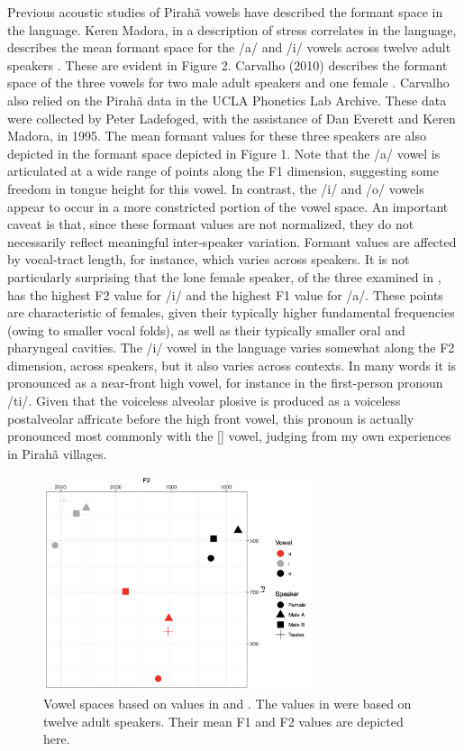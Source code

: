 \documentclass[output=paper,colorlinks,citecolor=brown
]{langscibook}
\begin{document}
    Previous acoustic studies of Pirahã vowels have described the formant space in the language. Keren Madora, in a description of stress correlates in the language, describes the mean formant space for the /a/ and /i/ vowels across twelve adult speakers \citep{everett1998acoustic}. These are evident in Figure 2. Carvalho (2010) describes the formant space of the three vowels for two male adult speakers and one female \citep{de2010vowel}. Carvalho also relied on the Pirahã data in the UCLA Phonetics Lab Archive. These data were collected by Peter Ladefoged, with the assistance of Dan Everett and Keren Madora, in 1995. The mean formant values for these three speakers are also depicted in the formant space depicted in Figure 1. Note that the /a/ vowel is articulated at a wide range of points along the F1 dimension, suggesting some freedom in tongue height for this vowel. In contrast, the /i/ and /o/ vowels appear to occur in a more constricted portion of the vowel space. An important caveat is that, since these formant values are not normalized, they do not necessarily reflect meaningful inter-speaker variation. Formant values are affected by vocal-tract length, for instance, which varies across speakers. It is not particularly surprising that the lone female speaker, of the three examined in , has the highest F2 value for /i/ and the highest F1 value for /a/. These points are characteristic of females, given their typically higher fundamental frequencies (owing to smaller vocal folds), as well as their typically smaller oral and pharyngeal cavities. The /i/ vowel in the language varies somewhat along the F2 dimension, across speakers, but it also varies across contexts. In many words it is pronounced as a near-front high vowel, for instance in the first-person pronoun /ti/. Given that the voiceless alveolar plosive is produced as a voiceless postalveolar affricate before the high front vowel, this pronoun is actually pronounced most commonly with the [{\textsci}] vowel, judging from my own experiences in Pirahã villages.
\begin{figure}
\centering
\includegraphics[width=0.7\textwidth]{everett_figure2.png}
\caption{\label{fig:Figure 2}Vowel spaces based on values in  and . The values in  were based on twelve adult speakers. Their mean F1 and F2 values are depicted here.}
\end{figure}
\end{document}
